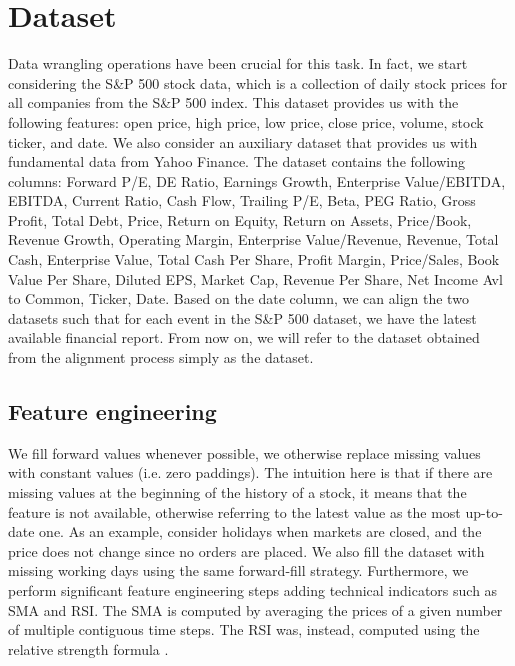 \documentclass{article}
\begin{document}
\section{Dataset}

Data wrangling operations have been crucial for this task. In fact, we start considering the S\&P 500 stock data, which is a collection of daily stock prices for all companies from the S\&P 500 index. This dataset provides us with the following features: open price, high price, low price, close price, volume, stock ticker, and date. We also consider an auxiliary dataset that provides us with fundamental data from Yahoo Finance. The dataset contains the following columns: Forward P/E, DE Ratio, Earnings Growth, Enterprise Value/EBITDA, EBITDA, Current Ratio, Cash Flow, Trailing P/E, Beta, PEG Ratio, Gross Profit, Total Debt, Price, Return on Equity, Return on Assets, Price/Book, Revenue Growth, Operating Margin, Enterprise Value/Revenue, Revenue, Total Cash, Enterprise Value, Total Cash Per Share, Profit Margin, Price/Sales, Book Value Per Share, Diluted EPS, Market Cap, Revenue Per Share, Net Income Avl to Common, Ticker, Date. Based on the date column, we can align the two datasets such that for each event in the S\&P 500 dataset, we have the latest available financial report. From now on, we will refer to the dataset obtained from the alignment process simply as the dataset.

\subsection{Feature engineering}

We fill forward values whenever possible, we otherwise replace missing values with constant values (i.e. zero paddings). The intuition here is that if there are missing values at the beginning of the history of a stock, it means that the feature is not available, otherwise referring to the latest value as the most up-to-date one. As an example, consider holidays when markets are closed, and the price does not change since no orders are placed. We also fill the dataset with missing working days using the same forward-fill strategy.
Furthermore, we perform significant feature engineering steps adding technical indicators
such as SMA and RSI. The SMA is computed by averaging the prices of a given number of multiple
contiguous time steps. The RSI was, instead, computed using the relative strength formula
\cite{rsi}.
\end{document}
